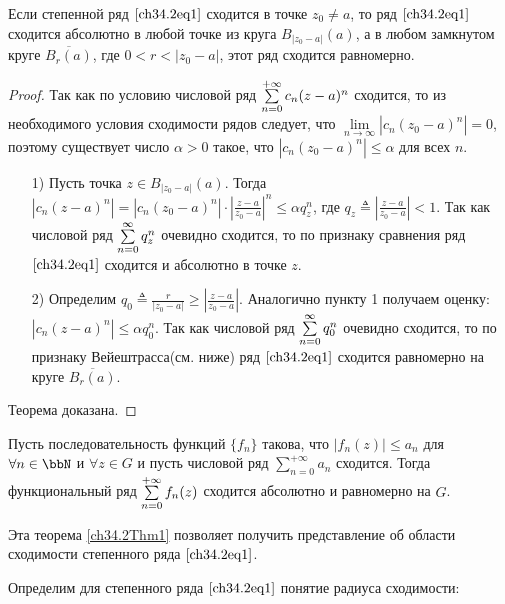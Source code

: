 \begin{thm}[Абель] \label{ch34.2Thm1}
Если степенной ряд $\eqref{ch34.2eq1}$ сходится в точке $z_0 \not= a$, то ряд $\eqref{ch34.2eq1}$ сходится абсолютно в любой точке из круга $B_{|z_0 - a|}(a)$, а в любом замкнутом круге $\overline{B_{r}(a)}$, где $0 < r < |z_0 - a|$, этот ряд сходится равномерно.
\end{thm}
\begin{proof}
Так как по условию числовой ряд $\sum_{n = 0}^{+\infty}\limits c_n (z - a)^n$ сходится, то из необходимого условия сходимости рядов следует, что $\lim\limits_{n \to \infty} |c_n(z_0 - a)^n| = 0$, поэтому существует число $\alpha > 0$ такое, что $|c_n(z_0 - a)^n| \le \alpha$ для всех $n$.
\begin{enumerate}
\item[1)] {\rightskip=3.5cm} { Пусть точка $z \in B_{|z_0 - a|}(a)$. Тогда $|c_n(z - a)^n| = |c_n(z_0 - a)^n| \cdot \left| \frac{z - a}{z_0 - a} \right|^n \le \alpha q^{n}_z$, где $q_z \triangleq \left| \frac{z - a}{z_0 - a} \right| < 1$. Так как числовой ряд $\sum_{n = 0}^{\infty}\limits q_{z}^n$ очевидно сходится, то по признаку сравнения ряд $\eqref{ch34.2eq1}$ сходится и абсолютно в точке $z$.
}
\item[2)] {\rightskip=0cm}Определим $q_0 \triangleq \frac{r}{|z_0 - a|}\ge\left|\frac{z - a}{z_0 - a}\right|$. Аналогично пункту 1 получаем оценку: $|c_n(z - a)^n| \le \alpha q^{n}_0$. Так как числовой ряд $\sum_{n = 0}^{\infty}\limits q_{0}^n$ очевидно сходится, то по признаку Вейештрасса(см. ниже) ряд $\eqref{ch34.2eq1}$ сходится равномерно на круге $\overline{B_{r}(a)}$.
\end{enumerate}
{\rightskip=-3.3cm} Теорема доказана.
\end{proof}

\begin{stt}
Пусть последовательность функций $\{f_n\}$ такова, что $|f_n(z)| \le a_n$ для $\forall n \in \bbN$ и $\forall z \in G$ и пусть числовой ряд $\sum\limits_{n = 0}^{+\infty} a_n$ сходится. Тогда функциональный ряд $\sum_{n = 0}^{+\infty}\limits f_n(z)$ сходится абсолютно и равномерно на $G$. 
\end{stt}

Эта теорема \ref{ch34.2Thm1} позволяет получить представление об области сходимости степенного ряда $\eqref{ch34.2eq1}$.

Определим для степенного ряда $\eqref{ch34.2eq1}$ понятие $\textit{радиуса сходимости}$:


